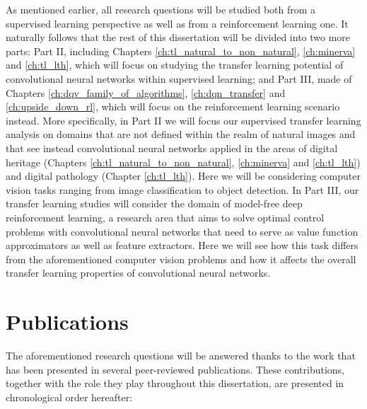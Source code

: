 As mentioned earlier, all research questions will be studied both from a supervised learning perspective as well as from a reinforcement learning one. It naturally follows that the rest of this dissertation will be divided into two more parts: Part II, including Chapters \ref{ch:tl_natural_to_non_natural}, \ref{ch:minerva} and \ref{ch:tl_lth}, which will focus on studying the transfer learning potential of convolutional neural networks within supervised learning; and Part III, made of Chapters \ref{ch:dqv_family_of_algorithms}, \ref{ch:dqn_transfer} and \ref{ch:upside_down_rl}, which will focus on the reinforcement learning scenario instead. More specifically, in Part II we will focus our supervised transfer learning analysis on domains that are not defined within the realm of natural images and that see instead convolutional neural networks applied in the areas of digital heritage (Chapters \ref{ch:tl_natural_to_non_natural}, \ref{ch:minerva} and \ref{ch:tl_lth}) and digital pathology (Chapter \ref{ch:tl_lth}). Here we will be considering computer vision tasks ranging from image classification to object detection. In Part III, our transfer learning studies will consider the domain of model-free deep reinforcement learning, a research area that aims to solve optimal control problems with convolutional neural networks that need to serve as value function approximators as well as feature extractors. Here we will see how this task differs from the aforementioned computer vision problems and how it affects the overall transfer learning properties of convolutional neural networks. 


\section*{Publications}

The aforementioned research questions will be answered thanks to the work that has been presented in several peer-reviewed publications. These contributions, together with the role they play throughout this dissertation, are presented in chronological order hereafter:

